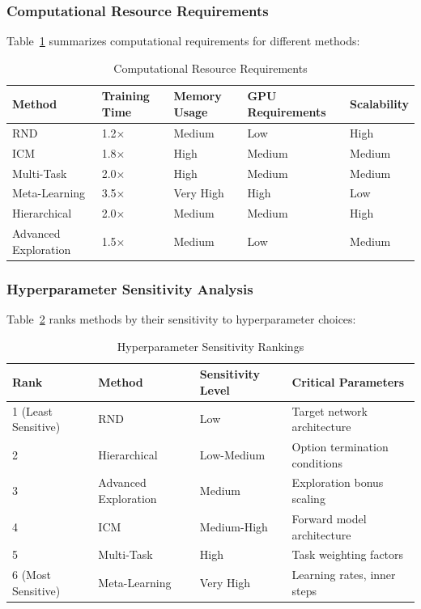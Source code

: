 \documentclass[12pt]{article}
\begin{document}
{{{\subsubsection{Computational Resource Requirements}

Table~\ref{tab:computational_requirements} summarizes computational requirements for different methods:

\begin{table}[h]
\centering
\caption{Computational Resource Requirements}
\label{tab:computational_requirements}
\begin{tabular}{|l|l|l|l|l|}
\hline
\textbf{Method} & \textbf{Training Time} & \textbf{Memory Usage} & \textbf{GPU Requirements} & \textbf{Scalability} \\
\hline
RND & 1.2× & Medium & Low & High \\
ICM & 1.8× & High & Medium & Medium \\
Multi-Task & 2.0× & High & Medium & Medium \\
Meta-Learning & 3.5× & Very High & High & Low \\
Hierarchical & 2.0× & Medium & Medium & High \\
Advanced Exploration & 1.5× & Medium & Low & Medium \\
\hline
\end{tabular}
\end{table}

\subsubsection{Hyperparameter Sensitivity Analysis}

Table~\ref{tab:hyperparameter_sensitivity} ranks methods by their sensitivity to hyperparameter choices:

\begin{table}[h]
\centering
\caption{Hyperparameter Sensitivity Rankings}
\label{tab:hyperparameter_sensitivity}
\begin{tabular}{|l|l|l|l|}
\hline
\textbf{Rank} & \textbf{Method} & \textbf{Sensitivity Level} & \textbf{Critical Parameters} \\
\hline
1 (Least Sensitive) & RND & Low & Target network architecture \\
2 & Hierarchical & Low-Medium & Option termination conditions \\
3 & Advanced Exploration & Medium & Exploration bonus scaling \\
4 & ICM & Medium-High & Forward model architecture \\
5 & Multi-Task & High & Task weighting factors \\
6 (Most Sensitive) & Meta-Learning & Very High & Learning rates, inner steps \\
\hline
\end{tabular}
\end{table}

}}}
\end{document}
